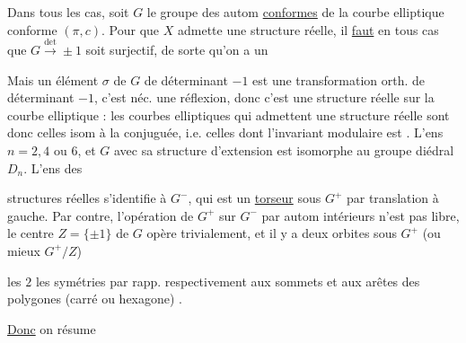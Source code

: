  

Dans tous les cas, soit $G$ le groupe des autom \uline{conformes} de la courbe elliptique conforme  $(\pi,c)$. Pour que  $X$ admette une structure réelle, il \uline{faut} en tous cas que $G\xrightarrow{\det}\pm1$ soit surjectif, de sorte qu'on a un


Mais un élément $\sigma$ de $G$ de déterminant $-1$ est une transformation orth. de déterminant $-1$, c'est néc. une réflexion, donc c'est une structure réelle sur la courbe elliptique : les courbes elliptiques qui admettent une structure réelle sont donc celles isom à la conjuguée, i.e. celles dont l'invariant modulaire est . L'ens      $n=2,4$ ou $6$, et $G$  avec sa structure d'extension est isomorphe au groupe diédral $D_n$. L'ens des


structures réelles s'identifie à $G^-$, qui est un \uline{torseur} sous $G^+$ par translation à gauche. Par contre, l'opération de $G^+$ sur $G^-$ par autom intérieurs n'est pas libre, le centre $Z=\{\pm1\}$ de $G$ opère trivialement, et il y a deux orbites sous $G^+$ (ou mieux $G^+/Z$)

 les $2$   les symétries par rapp. respectivement aux sommets et aux arêtes des  polygones (carré ou hexagone) .


\uline{Donc} on résume

